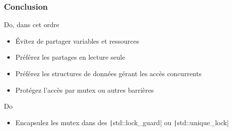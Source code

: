 \documentclass[C++.tex]{subfiles}
\begin{document}
\begin{frame}[fragile]
	\frametitle{Conclusion}
	\begin{exampleblock}{Do, dans cet ordre}
		\begin{itemize}
			\item Évitez de partager variables et ressources
			\item Préférez les partages en lecture seule
			\item Préférez les structures de données gérant les accès concurrents


			\item Protégez l'accès par mutex ou autres barrières
		\end{itemize}
	\end{exampleblock}

	\begin{exampleblock}{Do}
		\begin{itemize}
			\item Encapsulez les mutex dans des \texttt|std::lock_guard| ou \texttt|std::unique_lock|
		\end{itemize}
	\end{exampleblock}
\end{frame}
\end{document}
